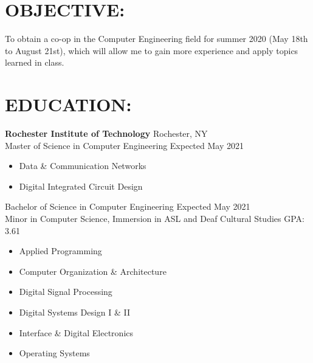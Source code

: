 \documentclass[line,margin]{res}
\begin{document}
\setlength\columnsep{-30pt}
\email{} %
\phone{} %
\address{} %
\address{} %
\website{} %

\begin{resume}
	 \setlength
	 \multicolsep{2pt}

	\section{OBJECTIVE:} %
		To obtain a co-op in the Computer Engineering field for summer 2020 (May 18th to August 21st), which will allow me to gain more experience and apply topics learned in class.

	\section{EDUCATION:} 
		\textbf{Rochester Institute of Technology} \hfill Rochester, NY\\
		Master of Science in Computer Engineering \hfill Expected May 2021 
		\begin{multicols}{2}
			\setlength\columnsep{1pt}
			\begin{itemize}
				\setlength{\itemindent}{-10pt}
				\item[] Data \& Communication Networks
				\item[] \hspace{10pt} Digital Integrated Circuit Design
			\end{itemize}
		\end{multicols}
		\vspace{-8pt}

		Bachelor of Science in Computer Engineering \hfill Expected May 2021\\ 
		Minor in Computer Science, Immersion in ASL and Deaf Cultural Studies \hfill GPA: 3.61

		\begin{multicols}{2}
			\setlength\columnsep{1pt}
			\begin{itemize}
				\setlength{\itemindent}{-10pt}
				\item[] Applied Programming
				\item[] Computer Organization \& Architecture
				\item[] Digital Signal Processing
				\item[] \hspace{10pt} Digital Systems Design I \& II
				\item[] \hspace{10pt} Interface \& Digital Electronics
				\item[] \hspace{10pt} Operating Systems
			\end{itemize}
		\end{multicols}


\end{resume}
\end{document}
